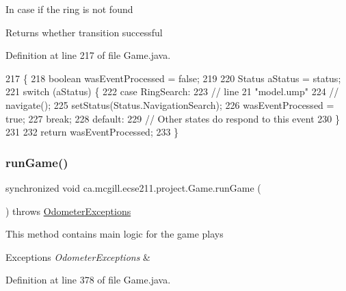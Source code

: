 In case if the ring is not found

\begin{DoxyReturn}{Returns}
whether transition successful 
\end{DoxyReturn}


Definition at line 217 of file Game.\+java.


\begin{DoxyCode}
217                                 \{
218     \textcolor{keywordtype}{boolean} wasEventProcessed = \textcolor{keyword}{false};
219 
220     Status aStatus = status;
221     \textcolor{keywordflow}{switch} (aStatus) \{
222       \textcolor{keywordflow}{case} RingSearch:
223         \textcolor{comment}{// line 21 "model.ump"}
224         \textcolor{comment}{// navigate();}
225         setStatus(Status.NavigationSearch);
226         wasEventProcessed = \textcolor{keyword}{true};
227         \textcolor{keywordflow}{break};
228       \textcolor{keywordflow}{default}:
229         \textcolor{comment}{// Other states do respond to this event}
230     \}
231 
232     \textcolor{keywordflow}{return} wasEventProcessed;
233   \}
\end{DoxyCode}
\mbox{\label{enumca_1_1mcgill_1_1ecse211_1_1project_1_1_game_a46cbbf56a4544524174d9d3e63fb9759}} 
\subsubsection{\texorpdfstring{run\+Game()}{runGame()}}
{\footnotesize\ttfamily synchronized void ca.\+mcgill.\+ecse211.\+project.\+Game.\+run\+Game (\begin{DoxyParamCaption}{ }\end{DoxyParamCaption}) throws \hyperlink{classca_1_1mcgill_1_1ecse211_1_1odometer_1_1_odometer_exceptions}{Odometer\+Exceptions}}

This method contains main logic for the game plays


\begin{DoxyExceptions}{Exceptions}
{\em Odometer\+Exceptions} & \\
\hline
\end{DoxyExceptions}


Definition at line 378 of file Game.\+java.



